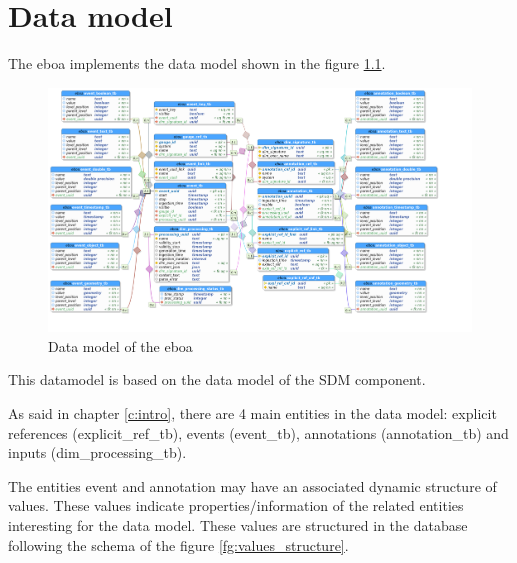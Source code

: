 \chapter{Data model}

The \acrshort{eboa} implements the data model shown in the figure \ref{fg:eboadb}.

\begin{figure}[H]
  \begin{center}
	\centering\includegraphics[width=150mm]{../fig/eboadb.png}
	\caption{Data model of the \acrshort{eboa}}
	\label{fg:eboadb}
  \end{center}
\end{figure}

This datamodel is based on the data model of the SDM component.

As said in chapter \ref{c:intro}, there are 4 main entities in the data model: explicit references (explicit\_ref\_tb), events (event\_tb), annotations (annotation\_tb) and inputs (dim\_processing\_tb).

The entities event and annotation may have an associated dynamic structure of values. These values indicate properties/information of the related entities interesting for the data model. These values are structured in the database following the schema of the figure \ref{fg:values_structure}.

